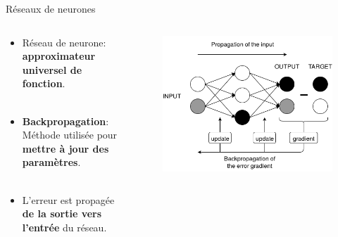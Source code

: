 \documentclass[hyperref={pdfpagelabels=false}]{beamer}
\begin{document}
    \begin{frame}{Réseaux de neurones}
        \begin{columns}
            \begin{column}{0.4\textwidth}
                \begin{itemize}
                    \item Réseau de neurone: \textbf{approximateur universel de 
                        fonction}.\\~\\
                    \item \textbf{Backpropagation}: Méthode utilisée pour 
                        \textbf{mettre à jour des paramètres}.\\~\\
                    \item L'erreur est propagée \textbf{de la sortie vers l'entrée} du 
                        réseau.
                \end{itemize}
            \end{column}
            \begin{column}{0.6\textwidth}
                \begin{figure}[h]
                    \centering
                    \includegraphics[scale=.20]{backprop}
                \end{figure}
            \end{column}
        \end{columns}
    \end{frame}
\end{document}
